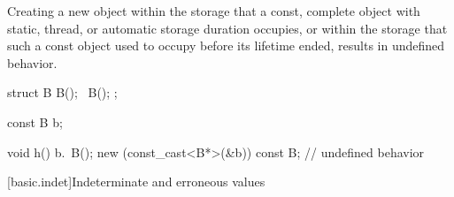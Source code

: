 \pnum
Creating a new object within the storage that a const, complete
object with static, thread, or automatic storage duration occupies,
or within the storage that such a const object used to occupy before
its lifetime ended, results in undefined behavior.
%
%
%
%
%
\begin{example}
\begin{codeblock}
struct B {
  B();
  ~B();
};

const B b;

void h() {
  b.~B();
  new (const_cast<B*>(&b)) const B;     // undefined behavior
}
\end{codeblock}
\end{example}

[basic.indet]{Indeterminate and erroneous values}

